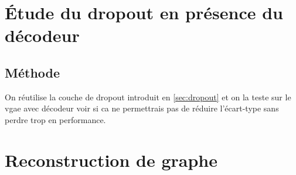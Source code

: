 \documentclass{article}
\begin{document}
\begin{table}[H]
    \captionsetup{justification=centering}
    \caption{Résultats de l'utilisation d'un décodeur. \\ \footnotesize Dans chaque case est indiqué la moyenne et l'écart-type au format : moyenne(écart-type)}
    \label{tab:decoder}
\end{table}

\section{Étude du dropout en présence du décodeur}
\subsection{Méthode}
On réutilise la couche de dropout introduit en \ref{sec:dropout} et on la teste sur le vgae avec décodeur voir si ca ne permettrais pas de réduire l'écart-type sans perdre trop en performance. 

\section{Reconstruction de graphe}
\end{document}
